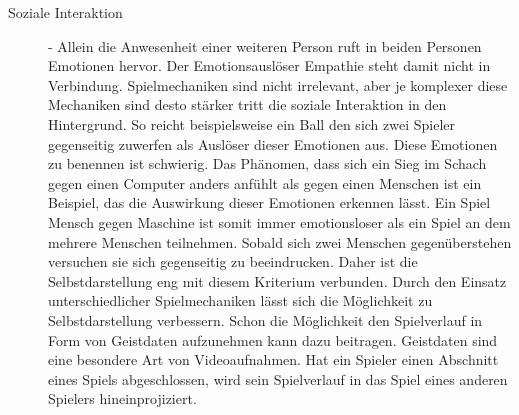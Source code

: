 \begin{description}
\item[Soziale Interaktion] - Allein die Anwesenheit einer weiteren Person ruft in beiden Personen Emotionen hervor. Der Emotionsauslöser Empathie steht damit nicht in Verbindung. Spielmechaniken sind nicht irrelevant, aber je komplexer diese Mechaniken sind desto stärker tritt die soziale Interaktion in den Hintergrund. So reicht beispielsweise ein Ball den sich zwei Spieler gegenseitig zuwerfen als Auslöser dieser Emotionen aus. Diese Emotionen zu benennen ist schwierig. Das Phänomen, dass sich ein Sieg  im Schach  gegen einen Computer anders anfühlt als gegen einen Menschen ist ein Beispiel, das die Auswirkung dieser Emotionen erkennen lässt. Ein Spiel Mensch gegen Maschine ist somit immer emotionsloser als ein Spiel an dem mehrere Menschen teilnehmen. Sobald sich zwei Menschen gegenüberstehen versuchen sie sich gegenseitig zu beeindrucken. Daher ist die Selbstdarstellung eng mit diesem Kriterium verbunden. Durch den Einsatz unterschiedlicher Spielmechaniken lässt sich die Möglichkeit zu Selbstdarstellung verbessern. Schon die Möglichkeit den Spielverlauf in Form von Geistdaten aufzunehmen kann dazu beitragen. Geistdaten sind eine besondere Art von Videoaufnahmen. Hat ein Spieler einen Abschnitt eines Spiels abgeschlossen, wird sein Spielverlauf in das Spiel eines anderen Spielers hineinprojiziert. \cite[S. 22 ff.]{Adams:1515529}

%
%
%



\end{description}
